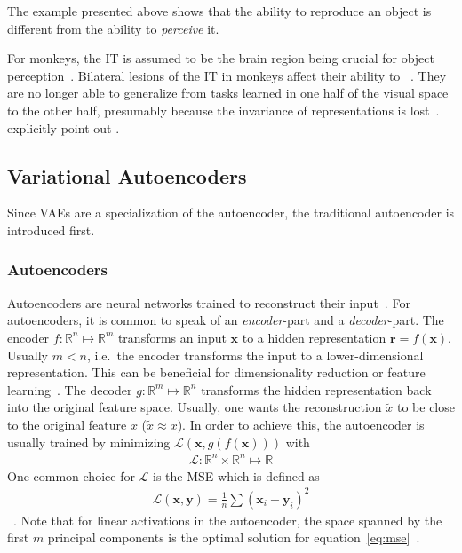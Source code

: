 The example presented above shows that the ability to reproduce an object is different from the ability to \textit{perceive} it.

For monkeys, the \ac{IT} is assumed to be the brain region being crucial for object perception~\citep[pp. 1070, 1071]{squire2012fundamental}.
Bilateral lesions of the \ac{IT} in monkeys affect their ability to ~\citep[p. 1070]{squire2012fundamental}.
They are no longer able to generalize from tasks learned in one half of the visual space to the other half, presumably because the invariance of representations is lost~\citep[p. 1070]{squire2012fundamental}.
\citet[p. 1071]{squire2012fundamental} explicitly point out .

\subsection{Variational Autoencoders}\label{subsec:variational-autoencoders}

Since \acfp{VAE} are a specialization of the autoencoder, the traditional autoencoder is introduced first.

\subsubsection{Autoencoders}

Autoencoders are neural networks trained to reconstruct their input~\citep[p. 499]{Goodfellow-et-al-2016}.
For autoencoders, it is common to speak of an \textit{encoder}-part and a \textit{decoder}-part.
The encoder $f: \mathbb{R}^n \mapsto \mathbb{R}^m$ transforms an input $\mathbf{x}$ to a hidden representation $\mathbf{r} = f(\mathbf{x})$.
Usually $m < n$, i.e.\ the encoder transforms the input to a lower-dimensional representation.
This can be beneficial for dimensionality reduction or feature learning~\citep[p. 499]{Goodfellow-et-al-2016}.
The decoder $g: \mathbb{R}^m \mapsto \mathbb{R}^n$ transforms the hidden representation back into the original feature space.
Usually, one wants the reconstruction $\tilde{x}$ to be close to the original feature $x$ ($\tilde{x} \approx x$).
In order to achieve this, the autoencoder is usually trained by minimizing $\mathcal{L}(\mathbf{x}, g(f(\mathbf{x})))$ with
\begin{align}
    \mathcal{L}: \mathbb{R}^n \times \mathbb{R}^n \mapsto \mathbb{R}
\end{align}
One common choice for $\mathcal{L}$ is the \ac{MSE} which is defined as
\begin{align}
    \mathcal{L}(\mathbf{x}, \mathbf{y}) = \frac{1}{n}\sum (\mathbf{x}_i - \mathbf{y}_i)^2 \label{eq:mse}
\end{align}~\citep[p. 106]{Goodfellow-et-al-2016}.
Note that for linear activations in the autoencoder, the space spanned by the first $m$ principal components is the optimal solution for equation~\ref{eq:mse}~\citep{chicco2014deep}.


